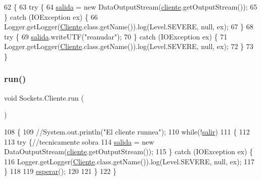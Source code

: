 \begin{DoxyCode}
62     \{
63         \textcolor{keywordflow}{try} \{
64             \mbox{\hyperlink{class_sockets_1_1_cliente_a0e85d127bffa834dc946bb2c39a8a7a2}{salida}} = \textcolor{keyword}{new} DataOutputStream(\mbox{\hyperlink{class_sockets_1_1_cliente_afe26e0d4cbe42f094ce76f958e15fb58}{cliente}}.getOutputStream());
65         \} \textcolor{keywordflow}{catch} (IOException ex) \{
66             Logger.getLogger(\mbox{\hyperlink{class_sockets_1_1_cliente_ab3aed9d5de2bafbb190c27a9c5e7cfd1}{Cliente}}.class.getName()).log(Level.SEVERE, null, ex);
67         \}
68         \textcolor{keywordflow}{try} \{
69             \mbox{\hyperlink{class_sockets_1_1_cliente_a0e85d127bffa834dc946bb2c39a8a7a2}{salida}}.writeUTF(\textcolor{stringliteral}{"reanudar"});
70         \} \textcolor{keywordflow}{catch} (IOException ex) \{
71             Logger.getLogger(\mbox{\hyperlink{class_sockets_1_1_cliente_ab3aed9d5de2bafbb190c27a9c5e7cfd1}{Cliente}}.class.getName()).log(Level.SEVERE, null, ex);
72         \}
73     \}
\end{DoxyCode}
\mbox{\label{class_sockets_1_1_cliente_afcd5b6491c7ac4855464028c93d9b0de}} 
\subsubsection{\texorpdfstring{run()}{run()}}
{\footnotesize\ttfamily void Sockets.\+Cliente.\+run (\begin{DoxyParamCaption}{ }\end{DoxyParamCaption})\hspace{0.3cm}{\ttfamily [inline]}}


\begin{DoxyCode}
108     \{
109         \textcolor{comment}{//System.out.println("El cliente runnea");}
110         \textcolor{keywordflow}{while}(!\mbox{\hyperlink{class_sockets_1_1_cliente_ab72910fbf98a6c65607aeb382526389a}{salir}})
111         \{
112             
113         \textcolor{keywordflow}{try} \{\textcolor{comment}{//tecnicamente sobra}
114             \mbox{\hyperlink{class_sockets_1_1_cliente_a0e85d127bffa834dc946bb2c39a8a7a2}{salida}} = \textcolor{keyword}{new} DataOutputStream(\mbox{\hyperlink{class_sockets_1_1_cliente_afe26e0d4cbe42f094ce76f958e15fb58}{cliente}}.getOutputStream());
115         \} \textcolor{keywordflow}{catch} (IOException ex) \{
116             Logger.getLogger(\mbox{\hyperlink{class_sockets_1_1_cliente_ab3aed9d5de2bafbb190c27a9c5e7cfd1}{Cliente}}.class.getName()).log(Level.SEVERE, null, ex);
117         \}
118             
119         \mbox{\hyperlink{class_sockets_1_1_cliente_ad771c3e62e58392ade4f7cddb361bf05}{esperar}}();
120         
121         \}
122     \}
\end{DoxyCode}


